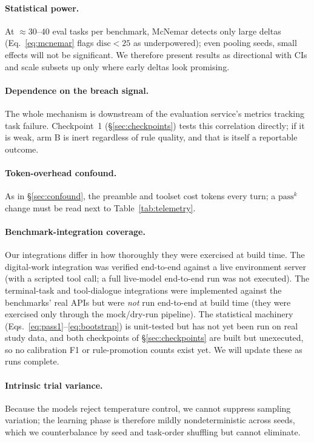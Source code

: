\documentclass[letterpaper]{article} %
\newcommand{\passk}{\mathrm{pass}^{k}}
\begin{document}
\paragraph{Statistical power.} At $\approx\!30$--$40$ eval tasks per benchmark, McNemar detects
only large deltas (Eq.~\eqref{eq:mcnemar} flags $\mathrm{disc}<25$ as underpowered); even
pooling seeds, small effects will not be significant. We therefore present results as
directional with CIs and scale subsets up only where early deltas look promising.

\paragraph{Dependence on the breach signal.} The whole mechanism is downstream of the
evaluation service's metrics tracking task failure. Checkpoint~1 (\S\ref{sec:checkpoints})
tests this correlation directly; if it is weak, arm B is inert regardless of rule quality, and
that is itself a reportable outcome.

\paragraph{Token-overhead confound.} As in \S\ref{sec:confound}, the preamble and toolset cost
tokens every turn; a $\passk$ change must be read next to Table~\ref{tab:telemetry}.

\paragraph{Benchmark-integration coverage.} Our integrations differ in how thoroughly they were
exercised at build time. The digital-work integration was verified end-to-end against a live
environment server (with a scripted tool call; a full live-model end-to-end run was not
executed). The terminal-task and tool-dialogue integrations were implemented against the
benchmarks' real APIs but were \emph{not} run end-to-end at build time (they were exercised
only through the mock/dry-run pipeline). The statistical machinery
(Eqs.~\eqref{eq:pass1}--\eqref{eq:bootstrap}) is unit-tested but has not yet been run on real
study data, and both checkpoints of \S\ref{sec:checkpoints} are built but unexecuted, so no
calibration F1 or rule-promotion counts exist yet. We will update these as runs complete.

\paragraph{Intrinsic trial variance.} Because the models reject temperature control, we cannot
suppress sampling variation; the learning phase is therefore mildly nondeterministic across
seeds, which we counterbalance by seed and task-order shuffling but cannot eliminate.
\end{document}

